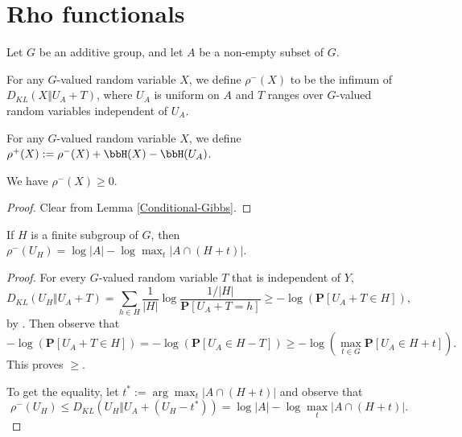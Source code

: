 \section{Rho functionals}

Let $G$ be an additive group, and let $A$ be a non-empty subset of $G$.

\begin{definition}\label{rhominus-def}\leanok  For any $G$-valued random variable $X$, we define $\rho^-(X)$ to be the infimum of $D_{KL}(X \Vert  U_A + T)$, where $U_A$ is uniform on $A$ and $T$ ranges over $G$-valued random variables independent of $U_A$.
\end{definition}

\begin{definition}\label{rhoplus-def}\leanok  For any $G$-valued random variable $X$, we define $\rho^+(X) := \rho^-(X) + \bbH(X) - \bbH(U_A)$.
\end{definition}

\begin{lemma}\label{rhominus-nonneg}\label{rhoMinus_nonneg}\leanok  We have $\rho^-(X) \geq 0$.
\end{lemma}

\begin{proof}\leanok {} Clear from Lemma \ref{Conditional-Gibbs}.
\end{proof}

\begin{lemma}\label{rhominus-subgroup}\leanok If $H$ is a finite subgroup of $G$, then $\rho^-(U_H) = \log |A| - \log \max_t |A \cap (H+t)|$.
\end{lemma}

\begin{proof}\leanok
  For every $G$-valued random variable $T$ that is independent of $Y$,
  $$D_{KL}(U_H \Vert U_A+T) = \sum_{h\in H} \frac{1}{|H|}\log\frac{1/|H|}{\mathbf{P}[U_A+T=h]}\ge -\log(\mathbf{P}[U_A+T\in H]),$$
  by . Then observe that $$-\log(\mathbf{P}[U_A+T\in H])=-\log(\mathbf{P}[U_A\in H-T])\ge -\log(\max_{t\in G} \mathbf{P}[U_A\in H+t]).$$ This proves $\ge$.

  To get the equality, let $t^*:=\arg\max_t |A \cap (H+t)|$ and observe that $$\rho^-(U_H)\le D_{KL}(U_H \Vert  U_A+(U_H-t^*))= \log |A| - \log \max_t|A \cap (H+t)|.$$
\end{proof}


